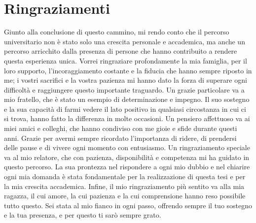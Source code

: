 \documentclass[12pt, a4paper, italian]{report}
\numberwithin{figure}{chapter}
\numberwithin{table}{chapter}
\begin{document}
\cleardoublepage
{}
{} %
\listoffigures

\cleardoublepage
{}
{}
\listoftables

\chapter*{Ringraziamenti}
Giunto alla conclusione di questo cammino, mi rendo conto che il percorso universitario non è stato solo una crescita personale e accademica, ma anche un percorso arricchito dalla presenza di persone che hanno contribuito a rendere questa esperienza unica.
Vorrei ringraziare profondamente la mia famiglia, per il loro supporto, l'incoraggiamento costante e la fiducia che hanno sempre riposto in me; i vostri sacrifici e la vostra pazienza mi hanno dato la forza di superare ogni difficoltà e raggiungere questo importante traguardo.
Un grazie particolare va a mio fratello, che è stato un esempio di determinazione e impegno. Il suo sostegno e la sua capacità di farmi vedere il lato positivo in qualsiasi circostanza in cui ci si trova, hanno fatto la differenza in molte occasioni.
Un pensiero affettuoso va ai miei amici e colleghi, che hanno condiviso con me gioie e sfide durante questi anni. Grazie per avermi sempre ricordato l'importanza di ridere, di prendersi delle pause e di vivere ogni momento con entusiasmo.
Un ringraziamento speciale va al mio relatore, che con pazienza, disponibilità e competenza mi ha guidato in questo percorso. La sua prontezza nel rispondere a ogni mio dubbio e nel chiarire ogni mia domanda è stata fondamentale per la realizzazione di questa tesi e per la mia crescita accademica.
Infine, il mio ringraziamento più sentito va alla mia ragazza, il cui amore, la cui pazienza e la cui comprensione hanno reso possibile tutto questo. Sei stata al mio fianco in ogni passo, offrendo sempre il tuo sostegno e la tua presenza, e per questo ti sarò sempre grato.

\printbibliography[title={Bibliografia}]
\end{document}
